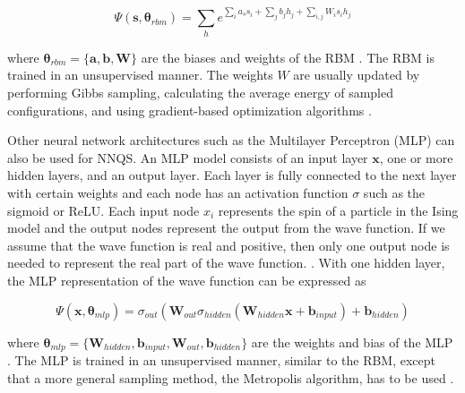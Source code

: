 \begin{equation}
    \Psi(\boldsymbol{s}, \boldsymbol{\theta}_{rbm}) = \sum_{h} e^{\sum_i a_s s_i + \sum_j b_j h_j + \sum_{i,j}W_i s_i h_j} 
\end{equation}

where  $\boldsymbol{\theta}_{rbm} = \{\boldsymbol{a}, \boldsymbol{b}, \boldsymbol{W}\}$ are the biases and weights of the RBM \cite{b20}. The RBM is trained in an unsupervised manner. The weights $W$ are usually updated by performing Gibbs sampling, calculating the average energy of sampled configurations, and using gradient-based optimization algorithms \cite{b25}.

Other neural network architectures such as the Multilayer Perceptron (MLP) can also be used for NNQS. An MLP model consists of an input layer $\boldsymbol{x}$, one or more hidden layers, and an output layer. Each layer is fully connected to the next layer with certain weights and each node has an activation function $\sigma$ such as the sigmoid or ReLU. Each input node $x_i$ represents the spin of a particle in the Ising model and the output nodes represent the output from the wave function. If we assume that the wave function is real and positive, then only one output node is needed to represent the real part of the wave function. \cite{b20}. With one hidden layer, the MLP representation of the wave function can be expressed as

\begin{equation}
    \Psi(\boldsymbol{x}, \boldsymbol{\theta}_{mlp}) = 
    \sigma_{out} \left(
    \boldsymbol{W}_{out}
    \sigma_{hidden} \left( \boldsymbol{W}_{hidden}\boldsymbol{x} + \boldsymbol{b}_{input} \right) + \boldsymbol{b}_{hidden} \right)
\end{equation}

where  $\boldsymbol{\theta}_{mlp} = \{\boldsymbol{W}_{hidden}, \boldsymbol{b}_{input}, \boldsymbol{W}_{out}, \boldsymbol{b}_{hidden}\}$ are the weights and bias of the MLP \cite{b20}. The MLP is trained in an unsupervised manner, similar to the RBM, except that a more general sampling method, the Metropolis algorithm, has to be used \cite{b25}.

